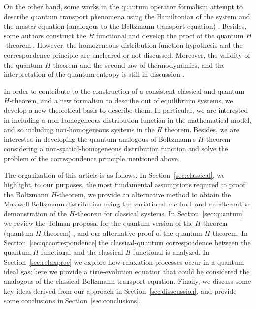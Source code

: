 On the other hand, some works in the quantum operator formalism attempt to
describe quantum transport phenomena using the Hamiltonian of the system and
the master equation (analogous to the Boltzmann transport equation)
\cite{bib:gorban2014,bib:bennaim2017,bib:tolman,bib:li2019}. %
Besides, some authors construct the $H$ functional and develop the proof of the
quantum $H$-theorem \cite{bib:silva2010,bib:deroeck2006,bib:grabert1974}.
However, the homogeneous distribution function hypothesis and the
correspondence principle are uncleared or not discussed. Moreover, the validity
of the quantum $H$-theorem and the second law of thermodynamics, and the
interpretation of the quantum entropy is still in discussion %
\cite{bib:silva2010,bib:deroeck2006,bib:grabert1974,bib:acharya2019,%
bib:kastner2017,bib:gring2012,bib:han2015,bib:das2018}.

In order to contribute to the construction of a consistent classical and
quantum $H$-theorem, and a new formalism to describe out of equilibrium
systems, we develop a new theoretical basis to describe them. In particular, we
are interested in including a non-homogeneous distribution function in the
mathematical model, and so including non-homogeneous systems in the $H$
theorem. Besides, we are interested in developing the quantum analogous of
Boltzmann's $H$-theorem considering a non-spatial-homogeneous distribution
function and solve the problem of the correspondence principle mentioned above.

The organization of this article is as follows.
In Section~\ref{sec:classical}, we highlight, to our purposes, the most
fundamental assumptions required to proof the Boltzmann $H$-theorem,
we provide an alternative method to obtain the Maxwell-Boltzmann
distribution using the variational method, and an alternative demonstration of
the $H$-theorem for classical systems. In Section~\ref{sec:quantum}
we review the Tolman proposal for the quantum
version of the $H$-theorem (quantum $H$-theorem)
,
and our alternative proof of the quantum $H$-theorem. In 
Section~\ref{sec:qccorrespondence}
the classical-quantum correspondence between the
quantum $H$ functional and the classical $H$ functional is analyzed.
In Section~\ref{sec:relaxproc} we explore how relaxation processes occur
in a quantum ideal gas; here we provide a time-evolution equation that could be
considered the analogous of the classical Boltzmann transport equation. Finally,
we discuss some key ideas derived from our approach in Section~\ref{sec:disscussion},
and provide some conclusions in Section~\ref{sec:conclusions}.

